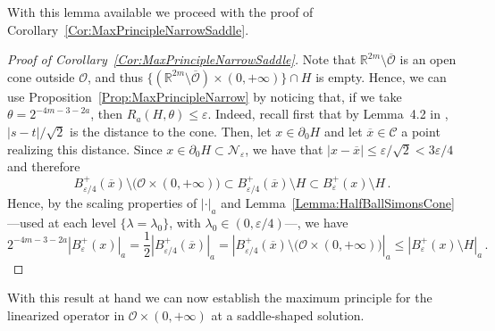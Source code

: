 \documentclass[12pt,reqno]{amsart}
\theoremstyle{definition}
\theoremstyle{remark}
\newcommand{\con}[1]{\mathbb{#1}}
\newcommand{\R}{\con{R}} %
\newcommand{\ccal}{\mathscr{C}}
\newcommand{\ncal}{\mathcal{N}}
\newcommand{\ocal}{\mathcal{O}}
\numberwithin{equation}{section}
\begin{document}
With this lemma available we proceed with the proof of Corollary~\ref{Cor:MaxPrincipleNarrowSaddle}.

\begin{proof}[Proof of Corollary~\ref{Cor:MaxPrincipleNarrowSaddle}]
Note that $\R^{2m} \setminus \overline{\ocal}$ is an open cone outside $\ocal$, and thus $\{ (\R^{2m} \setminus \overline{\ocal}) \times (0, +\infty) \} \cap H $ is empty. Hence, we can use Proposition~\ref{Prop:MaxPrincipleNarrow} by noticing that,  if we take $\theta = 2^{-4m - 3-2a}$, then $R_a(H,\theta)\leq \varepsilon$. Indeed, recall first that by Lemma~4.2 in \cite{CabreTerraI}, $|s-t|/\sqrt{2}$ is the distance to the cone. Then, let $x\in \partial_0 H$ and let $\overline{x}\in \ccal$ a point realizing this distance. Since $x\in \partial_0 H \subset \ncal_\varepsilon$, we have that $|x-\overline{x}| \leq \varepsilon /\sqrt{2} < 3\varepsilon /4$ and therefore
$$
B_{\varepsilon/4}^+ (\overline{x})\setminus \big( \ocal \times (0, +\infty)\big) \subset B_{\varepsilon/4}^+ (\overline{x})\setminus H \subset B_\varepsilon^+ (x)\setminus H\,.
$$
Hence, by the scaling properties of $|\cdot|_a$ and Lemma~\ref{Lemma:HalfBallSimonsCone} ---used at each level $\{\lambda = \lambda_0\}$, with $\lambda_0\in (0,\varepsilon/4)$---, we have
$$
2^{-4m - 3-2a} |B^+_\varepsilon (x)|_a = \dfrac{1}{2} |B_{\varepsilon/4}^+(\overline{x}) |_a = |B_{\varepsilon/4}^+ (\overline{x})\setminus \big( \ocal \times (0, +\infty)\big)  |_a \leq |B_\varepsilon^+ (x)\setminus H |_a\,.
$$
\end{proof}


With this result at hand we can now establish the maximum principle for the linearized operator in $\ocal\times (0,+\infty)$ at a saddle-shaped solution.
\end{document}

